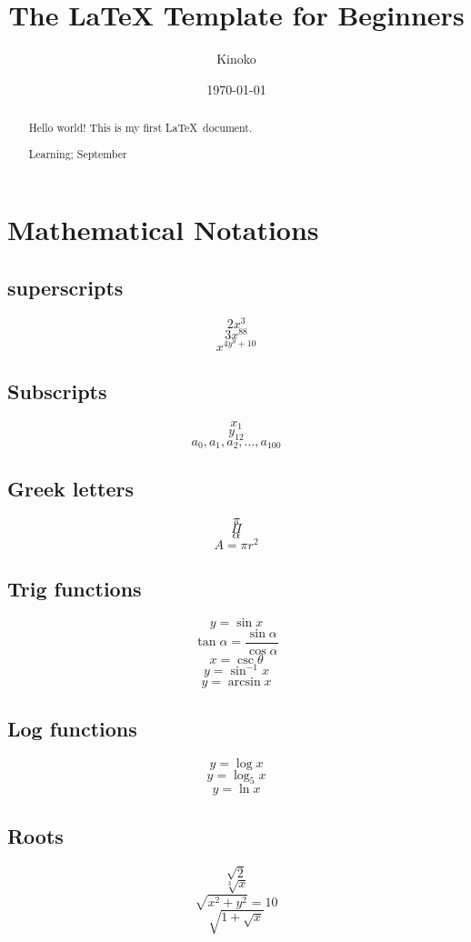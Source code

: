 \documentclass[12pt]{article}
\title{The LaTeX Template for Beginners}
\author{Kinoko}
\date{\today}
\begin{document}
\maketitle

\begin{abstract}
    Hello world! This is my first \LaTeX\ document. 

    \lipsum[1]

    \begin{keywords}
    Learning; September
    \end{keywords}
\end{abstract}
\newpage
\tableofcontents
\newpage

\section{Mathematical Notations}
\subsection{superscripts} 
$$2x^3$$
$$3x^{88}$$
$$x^{4y^9+10}$$

\subsection{Subscripts}
$$x_1$$
$$y_{12}$$
$$a_0,a_1,a_2,\dots,a_{100}$$

\subsection{Greek letters}
$$\pi$$
$$\Pi$$
$$\alpha$$
$$A=\pi r^2$$

\subsection{Trig functions}
$$y=\sin x$$
$$\tan \alpha=\frac{\sin \alpha}{\cos \alpha}$$
$$x=\csc \theta$$
$$y=\sin^{-1}x$$
$$y=\arcsin x$$

\subsection{Log functions}
$$y=\log x$$
$$y=\log_5  x$$
$$y=\ln x$$

\subsection{Roots}
$$\sqrt2$$
$$\sqrt[3]{x}$$
$$\sqrt{x^2+y^2}=10$$
$$\sqrt{  1+\sqrt{x}  }$$
\end{document}
